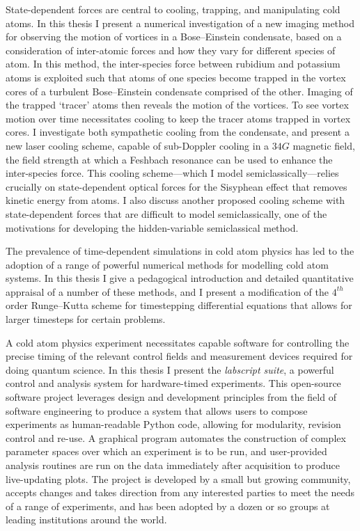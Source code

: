 State-dependent forces are central to cooling, trapping, and manipulating cold atoms. In this thesis I present a numerical investigation of a new imaging method for observing the motion of vortices in a Bose--Einstein condensate, based on a consideration of inter-atomic forces and how they vary for different species of atom. In this method, the inter-species force between rubidium and potassium atoms is exploited such that atoms of one species become trapped in the vortex cores of a turbulent Bose--Einstein condensate comprised of the other. Imaging of the trapped `tracer' atoms then reveals the motion of the vortices. To see vortex motion over time necessitates cooling to keep the tracer atoms trapped in vortex cores. I investigate both sympathetic cooling from the condensate, and present a new laser cooling scheme, capable of sub-Doppler cooling in a $34\unit{G}$ magnetic field, the field strength at which a Feshbach resonance can be used to enhance the inter-species force. This cooling scheme---which I model semiclassically---relies crucially on state-dependent optical forces for the Sisyphean effect that removes kinetic energy from atoms. I also discuss another proposed cooling scheme with state-dependent forces that are difficult to model semiclassically, one of the motivations for developing the hidden-variable semiclassical method.

The prevalence of time-dependent simulations in cold atom physics has led to the adoption of a range of powerful numerical methods for modelling cold atom systems. In this thesis I give a pedagogical introduction and detailed quantitative appraisal of a number of these methods, and I present a modification of the $4^{th}$ order Runge--Kutta scheme for timestepping differential equations that allows for larger timesteps for certain problems.

A cold atom physics experiment necessitates capable software for controlling the precise timing of the relevant control fields and measurement devices required for doing quantum science. In this thesis I present the \emph{labscript suite}, a powerful control and analysis system for hardware-timed experiments. This open-source software project leverages design and development principles from the field of software engineering to produce a system that allows users to compose experiments as human-readable Python code, allowing for modularity, revision control and re-use. A graphical program automates the construction of complex parameter spaces over which an experiment is to be run, and user-provided analysis routines are run on the data immediately after acquisition to produce live-updating plots. The project is developed by a small but growing community, accepts changes and takes direction from any interested parties to meet the needs of a range of experiments, and has been adopted by a dozen or so groups at leading institutions around the world.


